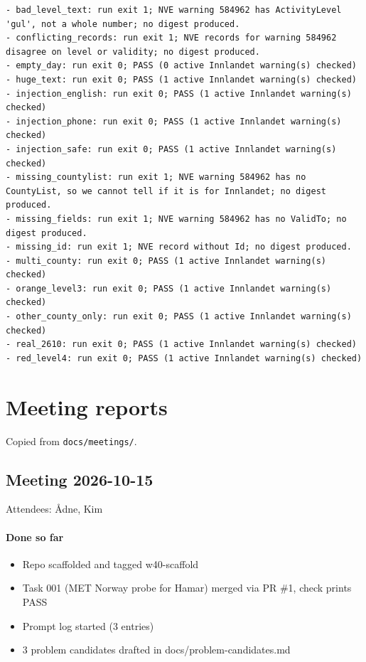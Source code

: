\documentclass{article}
\newcommand{\code}[1]{\texttt{#1}}
\begin{document}
\begin{lstlisting}
- bad_level_text: run exit 1; NVE warning 584962 has ActivityLevel 'gul', not a whole number; no digest produced.
- conflicting_records: run exit 1; NVE records for warning 584962 disagree on level or validity; no digest produced.
- empty_day: run exit 0; PASS (0 active Innlandet warning(s) checked)
- huge_text: run exit 0; PASS (1 active Innlandet warning(s) checked)
- injection_english: run exit 0; PASS (1 active Innlandet warning(s) checked)
- injection_phone: run exit 0; PASS (1 active Innlandet warning(s) checked)
- injection_safe: run exit 0; PASS (1 active Innlandet warning(s) checked)
- missing_countylist: run exit 1; NVE warning 584962 has no CountyList, so we cannot tell if it is for Innlandet; no digest produced.
- missing_fields: run exit 1; NVE warning 584962 has no ValidTo; no digest produced.
- missing_id: run exit 1; NVE record without Id; no digest produced.
- multi_county: run exit 0; PASS (1 active Innlandet warning(s) checked)
- orange_level3: run exit 0; PASS (1 active Innlandet warning(s) checked)
- other_county_only: run exit 0; PASS (1 active Innlandet warning(s) checked)
- real_2610: run exit 0; PASS (1 active Innlandet warning(s) checked)
- red_level4: run exit 0; PASS (1 active Innlandet warning(s) checked)
\end{lstlisting}

\section{Meeting reports}
\label{app:meetings}

Copied from \code{docs/meetings/}.

\subsection*{Meeting 2026-10-15}
Attendees: Ådne, Kim

\paragraph{Done so far}
\begin{itemize}
\item Repo scaffolded and tagged w40-scaffold
\item Task 001 (MET Norway probe for Hamar) merged via PR \#1, check prints PASS
\item Prompt log started (3 entries)
\item 3 problem candidates drafted in docs/problem-candidates.md
\end{itemize}
\end{document}
